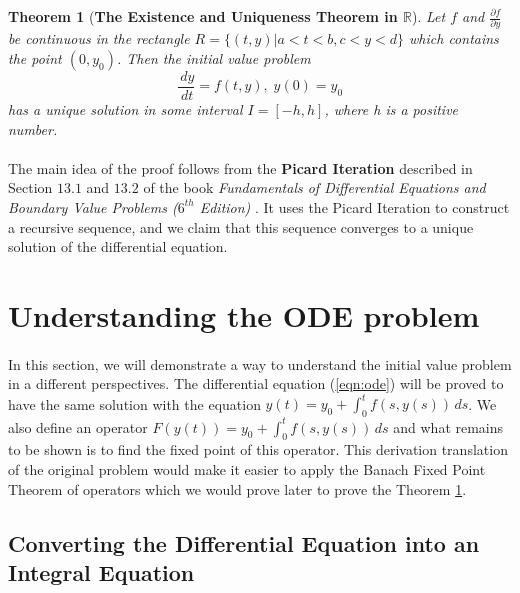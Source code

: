 \documentclass{article}
\newtheorem{theorem}{Theorem}[section]
\theoremstyle{definition}
\theoremstyle{remark}
\theoremstyle{example}
\begin{document}
\begin{theorem}[\textbf{The Existence and Uniqueness Theorem in $\mathbb{R}$}] \cite{r_kent_nagle_fundamentals_2011}
\label{thm:EUT}
Let $f$ and $\tfrac{\partial f}{\partial y}$ be continuous in the rectangle $R = \{(t,y)|a < t < b, c < y < d\}$ which contains the point $(0, y_0)$. Then the initial value problem
    \begin{equation}\label{eqn:ode}
        \dfrac{\,dy}{\,dt} = f(t,y),\; y(0) = y_0
    \end{equation}
has a unique solution in some interval $I = [-h, h]$, where h is a positive number.
\end{theorem}

\paragraph{  }
The main idea of the proof follows from the \textbf{Picard Iteration} described in Section $13.1$ and $13.2$ of the book \textit{Fundamentals of Differential Equations and Boundary Value Problems ($6^{th}$ Edition)} \cite{r_kent_nagle_fundamentals_2011}. It uses the Picard Iteration to construct a recursive sequence, and we claim that this sequence converges to a unique solution of the differential equation.

\section{Understanding the ODE problem}

\paragraph{  }

In this section, we will demonstrate a way to understand the initial value problem in a different perspectives. The differential equation (\ref{eqn:ode}) will be proved to have the same solution with the equation $y(t) = y_0 + \int_{0}^{t}{f(s,y(s))}\,ds$. We also define an operator $F(y(t)) = y_0 + \int_{0}^{t}{f(s,y(s))}\,ds$ and what remains to be shown is to find the fixed point of this operator. This derivation translation of the original problem would make it easier to apply the Banach Fixed Point Theorem of operators which we would prove later to prove the Theorem \ref{thm:EUT}.

\subsection{Converting the Differential Equation into an Integral Equation} \label{sec:3.1}
\end{document}
